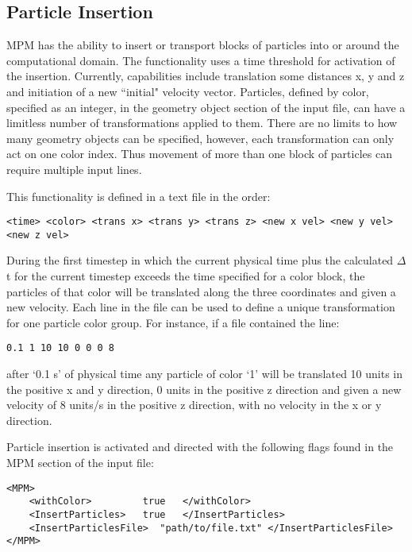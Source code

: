 \subsection{Particle Insertion} \label{Sec:ParticleInsert}
MPM has the ability to insert or transport blocks of particles into or
 around the computational domain.  The functionality uses a time threshold for 
activation of the insertion. Currently, capabilities include translation some 
distances x, y and z and initiation of a new ``initial" velocity vector.  Particles, 
defined by color, specified as an integer, in the geometry object section of the 
input file, can have a limitless number of transformations applied to them.  
There are no limits to how many geometry objects can be specified, however,
each transformation can only act on one color index.  Thus movement of more than
one block of particles can require multiple input lines.
 
This functionality is defined in a text file in the order: 

\begin{verbatim}
<time> <color> <trans x> <trans y> <trans z> <new x vel> <new y vel> <new z vel>
\end{verbatim}  

During the first timestep in which the current physical time plus the calculated 
$\Delta$t for the current timestep exceeds the time specified for a color block, the 
particles of that color will be translated along the three coordinates and given 
a new velocity.  Each line in the file can be used to define a unique transformation
for one particle color group.  For instance, if a file contained the line:

\begin{verbatim}
0.1 1 10 10 0 0 0 8 
\end{verbatim}

\noindent after `0.1 s' of physical time any particle of color `1' will be translated 10 
units in the positive x and y direction, 0 units in the positive z direction 
and given a new velocity of 8 units/s in the positive z direction, with no 
velocity in the x or y direction.

Particle insertion is activated and directed with the following flags found in the 
MPM section of the input file:
\begin{verbatim}
<MPM>
    <withColor>         true   </withColor>
    <InsertParticles>   true   </InsertParticles>
    <InsertParticlesFile>  "path/to/file.txt" </InsertParticlesFile>
</MPM>
\end{verbatim}

